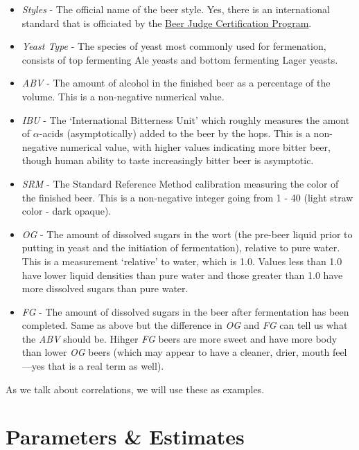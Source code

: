 \documentclass[
  letterpaper,
]{book}
\providecommand{\tightlist}{%
  \setlength{\itemsep}{0pt}\setlength{\parskip}{0pt}}
\begin{document}
\begin{itemize}
\tightlist
\item
  \emph{Styles} - The official name of the beer style. Yes, there is an
  international standard that is officiated by the
  \href{https://bjcp.org/}{Beer Judge Certification Program}.
\item
  \emph{Yeast Type} - The species of yeast most commonly used for
  fermenation, consists of top fermenting Ale yeasts and bottom
  fermenting Lager yeasts.\\
\item
  \emph{ABV} - The amount of alcohol in the finished beer as a
  percentage of the volume. This is a non-negative numerical value.
\item
  \emph{IBU} - The `International Bitterness Unit' which roughly
  measures the amont of \(\alpha\)-acids (asymptotically) added to the
  beer by the hops. This is a non-negative numerical value, with higher
  values indicating more bitter beer, though human ability to taste
  increasingly bitter beer is asymptotic.
\item
  \emph{SRM} - The Standard Reference Method calibration measuring the
  color of the finished beer. This is a non-negative integer going from
  1 - 40 (light straw color - dark opaque).
\item
  \emph{OG} - The amount of dissolved sugars in the wort (the pre-beer
  liquid prior to putting in yeast and the initiation of fermentation),
  relative to pure water. This is a measurement `relative' to water,
  which is 1.0. Values less than 1.0 have lower liquid densities than
  pure water and those greater than 1.0 have more dissolved sugars than
  pure water.
\item
  \emph{FG} - The amount of dissolved sugars in the beer after
  fermentation has been completed. Same as above but the difference in
  \emph{OG} and \emph{FG} can tell us what the \emph{ABV} should be.
  Hihger \emph{FG} beers are more sweet and have more body than lower
  \emph{OG} beers (which may appear to have a cleaner, drier, mouth
  feel---yes that is a real term as well).
\end{itemize}

As we talk about correlations, we will use these as examples.

\section{Parameters \& Estimates}\label{parameters-estimates}
\end{document}
